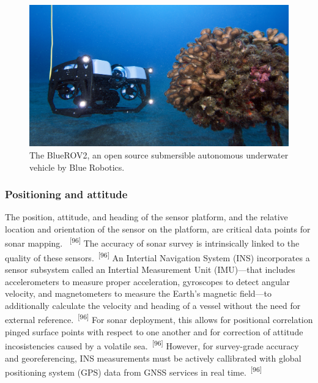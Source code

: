 \documentclass{article}
\begin{document}
\begin{figure}
    \centering
    \includegraphics[width=1.0\linewidth]{images/blue-rov.jpg}
    \caption{The BlueROV2, an open source submersible autonomous underwater vehicle by Blue Robotics.}
    \label{figure25}
\end{figure}


\subsubsection{Positioning and attitude}


\par{The position, attitude, and heading of the sensor platform, and the relative location and orientation of the sensor on the platform, are critical data points for sonar mapping. ~\textsuperscript{[96]} The accuracy of sonar survey is intrinsically linked to the quality of these sensors.~\textsuperscript{[96]} An Intertial Navigation System (INS) incorporates a sensor subsystem called an Intertial Measurement Unit (IMU)---that includes accelerometers to measure proper acceleration, gyroscopes to detect angular velocity, and magnetometers to measure the Earth's magnetic field---to additionally calculate the velocity and heading of a vessel without the need for external reference.~\textsuperscript{[96]} For sonar deployment, this allows for positional correlation pinged surface points with respect to one another and for correction of attitude incosistencies caused by a volatile sea.~\textsuperscript{[96]} However, for survey-grade accuracy and georeferencing, INS measurements must be actively callibrated with global positioning system (GPS) data from GNSS services in real time.~\textsuperscript{[96]}}
\end{document}
